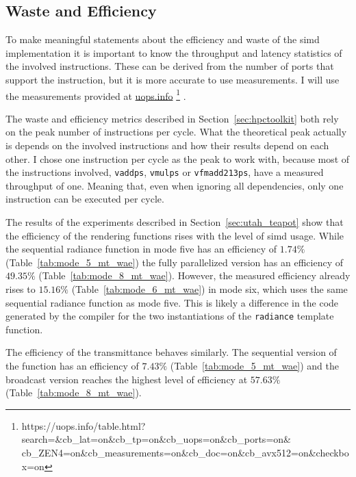 \documentclass[a4paper, 11pt]{memoir}
\begin{document}
    \subsection{Waste and Efficiency}
    \label{sec:res_waste}
    To make meaningful statements about the efficiency and waste of the \gls{simd} implementation it is important to know
    the \gls{throughput} and \gls{latency} statistics of the involved instructions. These can be derived from the number
    of ports that support the instruction, but it is more accurate to use measurements. I will use the measurements
    provided at \href{https://uops.info/table.html?search=&cb_lat=on&cb_tp=on&cb_uops=on&cb_ports=on&cb_ZEN4=on&cb_measurements=on&cb_doc=on&cb_avx512=on&checkbox=on}{uops.info}
    \footnote{https://uops.info/table.html?search=\&cb\_lat=on\&cb\_tp=on\&cb\_uops=on\&cb\_ports=on\&\\cb\_ZEN4=on\&cb\_measurements=on\&cb\_doc=on\&cb\_avx512=on\&checkbox=on}
    \cite{Abel19a}.

    The waste and efficiency metrics described in Section~\ref{sec:hpctoolkit} both rely on the peak number of instructions
    per cycle. What the theoretical peak actually is depends on the involved instructions and how their results depend
    on each other. I chose one instruction per cycle as the peak to work with, because most of the instructions
    involved, \eg \texttt{vaddps}, \texttt{vmulps} or \texttt{vfmadd213ps}, have a measured
    \gls{throughput} of one. Meaning that, even when ignoring all dependencies, only one instruction can be executed per
    cycle.

    The results of the experiments described in Section~\ref{sec:utah_teapot} show that the efficiency of the rendering
    functions rises with the level of \gls{simd} usage. While the sequential \gls{radiance} function in mode five has
    an efficiency of $1.74\%$ (Table~\ref{tab:mode_5_mt_wae}) the fully parallelized version has an efficiency of $49.35\%$
    (Table~\ref{tab:mode_8_mt_wae}). However, the measured efficiency already rises to $15.16\%$ (Table~\ref{tab:mode_6_mt_wae})
    in mode six, which uses the same sequential radiance function as mode five. This is likely a difference in the code
    generated by the compiler for the two instantiations of the \texttt{radiance} template function.

    The efficiency of the \gls{transmittance} behaves similarly. The sequential version of the function has an efficiency
    of $7.43\%$ (Table~\ref{tab:mode_5_mt_wae}) and the broadcast version reaches the highest level of efficiency at
    $57.63\%$ (Table~\ref{tab:mode_8_mt_wae}).
\end{document}
